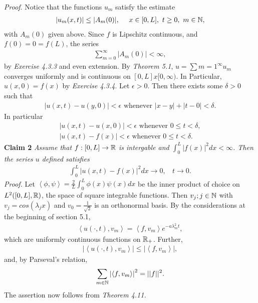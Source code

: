 \begin{questions}
\begin{solution}
\textit{Proof}. Notice that the functions $u_m$ satisfy the estimate
\begin{align*}
|u_m(x,t)|\leq |A_m(0)|,~~~~x\in[0,L],~t\geq 0,~m\in\mathbb{N},
\end{align*}
with $A_m(0)$ given above. Since $f$ is Lipschitz continuous, and $f(0)=0=f(L)$, the series
\begin{align*}
\sum_{m=0}^{\infty}|A_m(0)|<\infty,
\end{align*}
by \textsl{Exercise 4.3.3} and even extension. By \textsl{Theorem 5.1}, $u=\sum{m=1}^{\infty}u_m$ converges uniformly and is continuous on $[0,L]x[0,\infty)$. In Particular, $u(x, 0) = f(x)$ by \textsl{Exercise 4.3.4}. Let $\epsilon > 0$.
Then there exists some $\delta > 0$ such that
\begin{align*}
|u(x,t)-u(y,0)|<\epsilon\text{ whenever }|x-y|+|t-0|<\delta.
\end{align*}
In particular
\begin{align*}
|u(x,t)-u(x,0)|<\epsilon\text{ whenever }0\leq t<\delta,\\
|u(x,t)-f(x)|<\epsilon\text{ whenever }0\leq t<\delta.
\end{align*}
\textbf{Claim 2} \textit{Assume that $f : [0, L]\rightarrow\mathbb{R}$ is intergable and $\int_0^L|f(x)|^2dx<\infty$. Then the series $u$ defined satisfies}
\begin{align*}
\int_0^L|u(x, t) -f(x)|^2dx\rightarrow 0,~~~~t\rightarrow 0.
\end{align*}
\textit{Proof.} Let $\left<\phi,\psi\right> =\frac{2}{L}\int_0^L\phi(x)\psi(x)dx$ be the inner product of choice on $L^2([0, L], \mathbb{R})$, the space of square integrable functions. Then ${v_j ; j\in \mathbb{N}}$ with $v_j =  cos(\lambda_jx)$ and $v_0=\frac{1}{\sqrt{2}}$ is an orthonormal basis. By the considerations at the beginning of section 5.1, 
\begin{align*}
\left<u(\cdot,t),v_m\right>=\left<f,v_m\right>e^{-a\lambda_m^2t},
\end{align*}
which are uniformly continuous functions on $\mathbb{R}_+$. Further,
\begin{align*}
\left|\left<u(\cdot,t),v_m\right>\right|\leq\left|\left<f,v_m\right>\right|,
\end{align*}
and, by Parseval's relation,
\begin{align*}
\sum_{m\in\mathbb{N}}\left|\left<f,v_m\right>\right|^2=||f||^2.
\end{align*}
The assertion now follows from \textsl{Theorem 4.11.}


\end{solution}
\end{questions}
